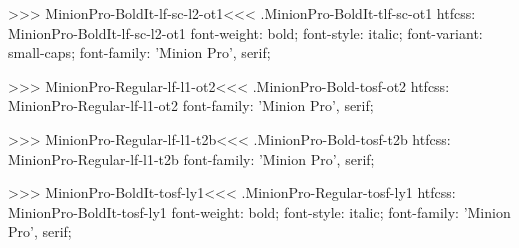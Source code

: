 {>>>
\<MinionPro-BoldIt-lf-sc-l2-ot1\><<<
.MinionPro-BoldIt-tlf-sc-ot1
htfcss:  MinionPro-BoldIt-lf-sc-l2-ot1  font-weight: bold; font-style: italic; font-variant: small-caps; font-family: 'Minion Pro', serif;

>>>
\<MinionPro-Regular-lf-l1-ot2\><<<
.MinionPro-Bold-tosf-ot2
htfcss:  MinionPro-Regular-lf-l1-ot2  font-family: 'Minion Pro', serif;

>>>
\<MinionPro-Regular-lf-l1-t2b\><<<
.MinionPro-Bold-tosf-t2b
htfcss:  MinionPro-Regular-lf-l1-t2b  font-family: 'Minion Pro', serif;

>>>
\<MinionPro-BoldIt-tosf-ly1\><<<
.MinionPro-Regular-tosf-ly1
htfcss:  MinionPro-BoldIt-tosf-ly1  font-weight: bold; font-style: italic; font-family: 'Minion Pro', serif;

}
